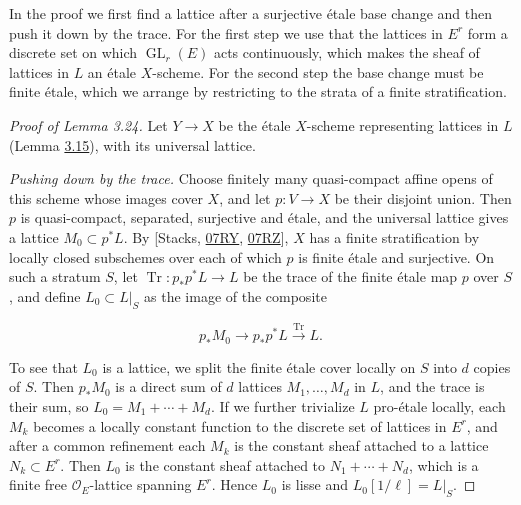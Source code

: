 \documentclass[11pt]{article}
\providecommand{\GL}{}\renewcommand{\GL}{\operatorname{GL}}
\begin{document}
\label{bp270}%
In the proof we first find a lattice after a surjective étale base change and then push it down by the trace. For the first step we use that the lattices in \(E^r\) form a discrete set on which \(\GL_r(E)\) acts continuously, which makes the sheaf of lattices in \(L\) an étale \(X\)-scheme. For the second step the base change must be finite étale, which we arrange by restricting to the strata of a finite stratification.

\begin{proof}[{Proof of Lemma 3.24}]\label{bp271}%
Let \(Y\to X\) be the étale \(X\)-scheme representing lattices in \(L\) (Lemma \hyperref[bp240]{3.15}), with its universal lattice.

\emph{Pushing down by the trace.} Choose finitely many quasi-compact affine opens of this scheme whose images cover \(X\), and let \(p:V\to X\) be their disjoint union. Then \(p\) is quasi-compact, separated, surjective and étale, and the universal lattice gives a lattice \(M_0\subset p^*L\). By [Stacks, \href{https://stacks.math.columbia.edu/tag/07RY}{07RY}, \href{https://stacks.math.columbia.edu/tag/07RZ}{07RZ}], \(X\) has a finite stratification by locally closed subschemes over each of which \(p\) is finite étale and surjective. On such a stratum \(S\), let \(\operatorname{Tr}:p_*p^*L\to L\) be the trace of the finite étale map \(p\) over \(S\), and define \(L_0\subset L|_S\) as the image of the composite

\[
p_*M_0\longrightarrow p_*p^*L\xrightarrow{\operatorname{Tr}}L.
\]

To see that \(L_0\) is a lattice, we split the finite étale cover locally on \(S\) into \(d\) copies of \(S\). Then \(p_*M_0\) is a direct sum of \(d\) lattices \(M_1,\dots,M_d\) in \(L\), and the trace is their sum, so \(L_0=M_1+\cdots+M_d\). If we further trivialize \(L\) pro-étale locally, each \(M_k\) becomes a locally constant function to the discrete set of lattices in \(E^r\), and after a common refinement each \(M_k\) is the constant sheaf attached to a lattice \(N_k\subset E^r\). Then \(L_0\) is the constant sheaf attached to \(N_1+\cdots+N_d\), which is a finite free \(\mathcal O_E\)-lattice spanning \(E^r\). Hence \(L_0\) is lisse and \(L_0[1/\ell]=L|_S\).
\end{proof}


\end{document}
